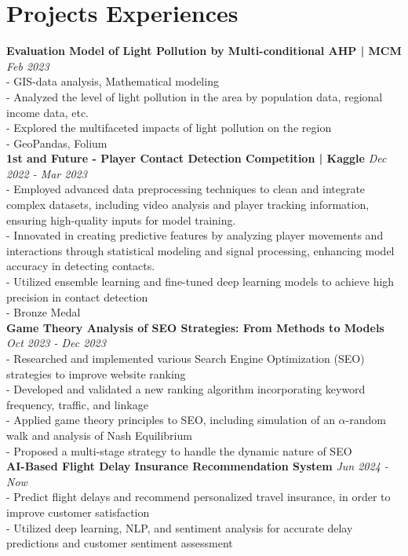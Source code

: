 \documentclass[a4paper,10pt]{article}
\begin{document}
\section*{Projects Experiences}
\textbf{Evaluation Model of Light Pollution by Multi-conditional AHP | MCM} \hfill \textit{Feb 2023}\\
- GIS-data analysis, Mathematical modeling\\
- Analyzed the level of light pollution in the area by population data, regional income data, etc.\\
- Explored the multifaceted impacts of light pollution on the region\\
- GeoPandas, Folium\\
\textbf{1st and Future - Player Contact Detection Competition | Kaggle} \hfill \textit{Dec 2022 - Mar 2023}\\
- Employed advanced data preprocessing techniques to clean and integrate complex datasets, including video analysis and player tracking information, ensuring high-quality inputs for model training.\\
- Innovated in creating predictive features by analyzing player movements and interactions through statistical modeling and signal processing, enhancing model accuracy in detecting contacts.\\
- Utilized ensemble learning and fine-tuned deep learning models to achieve high precision in contact detection\\
- Bronze Medal\\
\textbf{Game Theory Analysis of SEO Strategies: From Methods to Models} \hfill \textit{Oct 2023 - Dec 2023}\\
- Researched and implemented various Search Engine Optimization (SEO) strategies to improve website ranking\\
- Developed and validated a new ranking algorithm incorporating keyword frequency, traffic, and linkage\\
- Applied game theory principles to SEO, including simulation of an $\alpha$-random walk and analysis of Nash Equilibrium\\
- Proposed a multi-stage strategy to handle the dynamic nature of SEO\\
\textbf{AI-Based Flight Delay  Insurance Recommendation System} \hfill \textit{Jun 2024 - Now}\\
- Predict flight delays and recommend personalized travel insurance, in order to improve customer satisfaction\\
- Utilized deep learning, NLP, and sentiment analysis for accurate delay predictions and customer sentiment assessment\\
\end{document}
